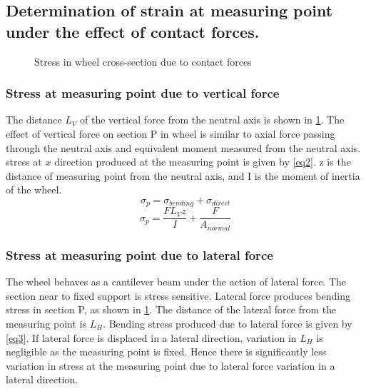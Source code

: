 \documentclass[]{interact}
\theoremstyle{plain}%
\theoremstyle{definition}
\theoremstyle{remark}
\begin{document}
\subsection{Determination of strain at measuring point under the effect of contact forces.}
\begin{figure}[h]
\centering
{}
\caption{Stress in wheel cross-section due to contact forces} \label{fig:stress}
\end{figure}

\subsubsection{Stress at measuring point due to vertical force}

The distance $L_V$ of the vertical force from the neutral axis is   shown in \cref{fig:stress}. The effect of vertical force on section P in wheel is similar to axial force passing through the neutral axis and equivalent moment measured from the neutral axis.  stress at $x$ direction produced at the measuring point is  given by \cref{eq2}. z is the distance of measuring point from the neutral axis, and I is the moment of inertia of the wheel.
\begin{equation}
\sigma_p= \sigma_{bending}+ \sigma_{direct} \label{eq1}
\end{equation}
\begin{equation}
\sigma_p= \frac{FL_Vz}{I} +   \frac{F}{A_{normal}}   \label{eq2}
\end{equation}


\subsubsection{Stress at measuring point due to lateral force}

The wheel behaves as a cantilever beam under the action of lateral force. The section near to fixed support is stress sensitive. Lateral force produces bending stress in section P, as shown in \cref{fig:stress}. The distance of the lateral force from the measuring point is $L_H$. Bending stress produced due to lateral force is given by \cref{eq3}. If lateral force is displaced in a lateral direction, variation in  $L_H$ is negligible as the measuring point is fixed. Hence there is significantly less variation in stress at the measuring point due to lateral force variation in a lateral direction.  
\end{document}
